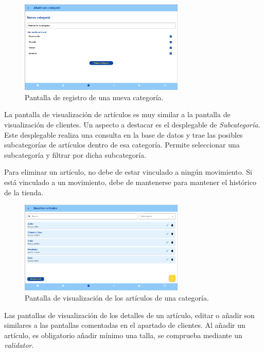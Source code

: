 \begin{figure}[H]
	\centering
	\includegraphics[width=0.7\textwidth]{imagenes/TerceraIteracion/newCategory.png}
	\caption{Pantalla de registro de una nueva categoría.}
\end{figure}

La pantalla de visualización de artículos es muy similar a la pantalla de visualización de clientes. Un aspecto a destacar es el desplegable de \textit{Subcategoría}. Este desplegable realiza una consulta en la base de datos y trae las posibles subcategorías de artículos dentro de esa categoría. Permite seleccionar una subcategoría y filtrar por dicha subcategoría. 

Para eliminar un artículo, no debe de estar vinculado a ningún movimiento. Si está vinculado a un movimiento, debe de mantenerse para mantener el histórico de la tienda. 

\begin{figure}[H]
	\centering
	\includegraphics[width=0.7\textwidth]{imagenes/TerceraIteracion/articleView.png}
	\caption{Pantalla de visualización de los artículos de una categoría.}
\end{figure}

Las pantallas de visualización de los detalles de un artículo, editar o añadir son similares a las pantallas comentadas en el apartado de clientes. Al añadir un artículo, es obligatorio añadir mínimo una talla, se comprueba mediante un \textit{validator}. 

